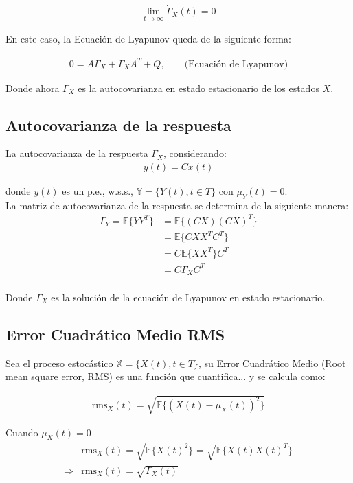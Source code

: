 \begin{align*}
    \lim_{t \to \infty} \dot{\Gamma}_X(t)=0
\end{align*}

En este caso, la Ecuación de Lyapunov queda de la siguiente forma:

\begin{align*}
   0 = A\Gamma_X + \Gamma_XA^T + Q, \qquad \text{(Ecuación de Lyapunov)}
\end{align*}

Donde ahora $\Gamma_X$ es la autocovarianza en estado estacionario de los estados $X$.\\

\subsection{Autocovarianza de la respuesta}
La autocovarianza de la respuesta $\Gamma_X$, considerando:
\begin{align*}
    y(t) = Cx(t)
\end{align*}

donde $y(t)$ es un p.e., w.s.s., $\mathbb{Y} = \{Y(t), t \in T\}$ con $\mu_Y(t)=0$.\\

La matriz de autocovarianza de la respuesta se determina de la siguiente manera:
\begin{align*}
    \Gamma_Y = \mathbb{E}\{YY^T\} &= \mathbb{E}\{(CX)(CX)^T\}\\
     &= \mathbb{E}\{CXX^T C^T\}\\
      &= C \mathbb{E}\{XX^T\}C^T\\
       &= C \Gamma_X C^T\\
\end{align*}

Donde $\Gamma_X$ es la solución de la ecuación de Lyapunov en estado estacionario.

\subsection{Error Cuadrático Medio RMS}
Sea el proceso estocástico $\mathbb{X} = \{X(t), t \in T\}$, su Error Cuadrático Medio (Root mean square error, RMS) es una función que cuantifica... y se calcula como:

\begin{align*}
    \text{rms}_X(t) = \sqrt{\mathbb{E}\{(X(t) - \mu_X(t))^2\}}
\end{align*}

Cuando $\mu_X(t) = 0$
\begin{align*}
    & \text{rms}_X(t) = \sqrt{\mathbb{E}\{X(t)^2\}} = \sqrt{\mathbb{E}\{X(t)X(t)^T\}} \\
    \Longrightarrow & \text{rms}_X(t) = \sqrt{\Gamma_{X}(t)} 
\end{align*}



